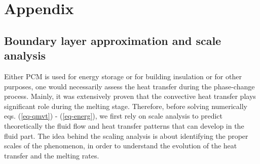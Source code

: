 \def\titcourt{ }
\def\titlong{ }


\chapter{Appendix} \label{chap-Appendix}

\section{Boundary layer approximation and scale analysis} \label{sec-bound-scal-anal}
Either PCM is used for energy storage or for building insulation or for other purposes, one would necessarily assess the heat transfer during the phase-change process.
Mainly, it was extensively proven that the convective heat transfer plays significant role during the melting stage.
Therefore, before solving numerically eqs. (\ref{eq-qmvt}) - (\ref{eq-energ}), we first rely on scale analysis to predict theoretically the fluid flow and heat transfer patterns that can develop in the fluid part.
The idea behind the scaling analysis is about identifying the proper scales of the phenomenon, in order to understand the evolution of the heat transfer and the melting rates.

